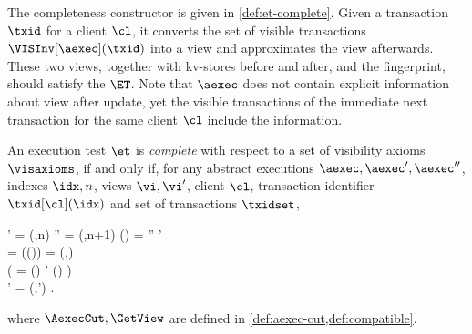 The completeness constructor is given in \cref{def:et-complete}.
Given a transaction \( \txid \) for a client \( \cl \),
it converts the set of visible transactions \( \VISInv[\aexec](\txid) \) into a view
and approximates the view afterwards.
These two views, together with kv-stores before and after, and the fingerprint, should satisfy the \( \ET \).
Note that \( \aexec \) does not contain explicit information about view after update,
yet the visible transactions of the immediate next transaction 
for the same client \( \cl \) include the information.

\begin{definition}
\label{def:et-complete}
An execution test \(\et\) is \emph{complete} with respect to a  set of visibility axioms \(\visaxioms \),
if and only if, for any abstract executions \( \aexec,\aexec',\aexec'' \), indexes \( \idx,n \), views \( \vi, \vi' \),
client \( \cl \), transaction identifier \( \txid[\cl](\idx) \) and set of transactions \( \txidset \), 
\begin{Formulae}
\begin{Formula}
    \aexec' = \AexecCut(\aexec,n)
    \land \aexec'' = \AexecCut(\aexec,n+1)
    \land \txid[\cl](\idx) = \aexec'' \setminus \aexec'
    \\ {} \land \txidset = \VISInv[\aexec](\txid[\cl](\idx))
    \land \vi = \GetView(\aexec,\txidset)
    \land {} 
    \\ {} \land \left(
        \Exists{\txid \in \aexec} 
            \txid = \Min[\SO]()
            \implies \txidset' \subseteq \VISInv[\aexec](\txid)
    \right)
    \\ {} \land \vi' = \GetView(\aexec,\txidset') 
    \implies {} .
\label{equ:et-complete}
\end{Formula}
\end{Formulae}
where \( \AexecCut, \GetView \) are defined in \cref{def:aexec-cut,def:compatible}.
\end{definition}

